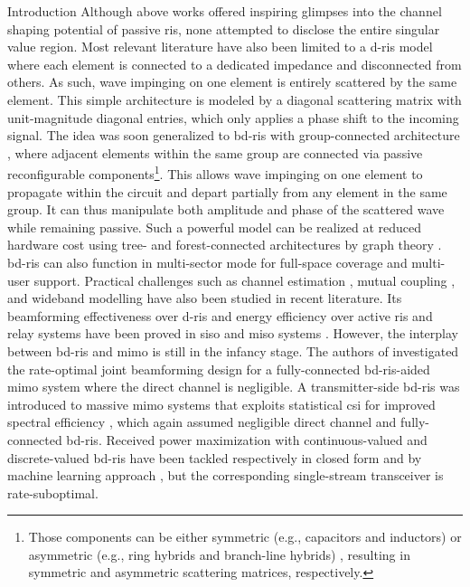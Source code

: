 \documentclass[journal]{IEEEtran}
\begin{document}
\begin{section}{Introduction}
		Although above works offered inspiring glimpses into the channel shaping potential of passive \gls{ris}, none attempted to disclose the entire singular value region.
		Most relevant literature \cite{ElMossallamy2021,Meng2023,Zheng2022,Huang2023,Bafghi2022,Zheng2023,Chae2023,Wu2019,Santamaria2023a} have also been limited to a \gls{d}-\gls{ris} model where each element is connected to a dedicated impedance and disconnected from others.
		As such, wave impinging on one element is entirely scattered by the same element.
		This simple architecture is modeled by a diagonal scattering matrix with unit-magnitude diagonal entries, which only applies a phase shift to the incoming signal.
		The idea was soon generalized to \gls{bd}-\gls{ris} with group-connected architecture \cite{Shen2020a}, where adjacent elements within the same group are connected via passive reconfigurable components\footnote{Those components can be either symmetric (e.g., capacitors and inductors) or asymmetric (e.g., ring hybrids and branch-line hybrids) \cite{Ahn2006}, resulting in symmetric and asymmetric scattering matrices, respectively.}.
		This allows wave impinging on one element to propagate within the circuit and depart partially from any element in the same group.
		It can thus manipulate both amplitude and phase of the scattered wave while remaining passive.
		Such a powerful model can be realized at reduced hardware cost using tree- and forest-connected architectures by graph theory \cite{Nerini2024}.
		\gls{bd}-\gls{ris} can also function in
		multi-sector mode \cite{Li2023c} for full-space coverage and multi-user support.
		Practical challenges such as channel estimation \cite{Li2024}, mutual coupling \cite{Li2023f}, and wideband modelling \cite{Li2024a} have also been studied in recent literature.
		Its beamforming effectiveness over \gls{d}-\gls{ris} and energy efficiency over active \gls{ris} and relay systems have been proved in \gls{siso} and \gls{miso} systems \cite{Shen2020a,Nerini2023,Nerini2024,Santamaria2023,Fang2023,Zhou2023,Li2023c,Soleymani2024}.
		However, the interplay between \gls{bd}-\gls{ris} and \gls{mimo} is still in the infancy stage.
		The authors of \cite{Bartoli2023} investigated the rate-optimal joint beamforming design for a fully-connected \gls{bd}-\gls{ris}-aided \gls{mimo} system where the direct channel is negligible.
		A transmitter-side \gls{bd}-\gls{ris} was introduced to
		massive \gls{mimo} systems that exploits statistical \gls{csi} for improved spectral efficiency \cite{Mishra2024}, which again assumed negligible direct channel and fully-connected \gls{bd}-\gls{ris}.
		Received power maximization with continuous-valued and discrete-valued \gls{bd}-\gls{ris} have been tackled respectively in closed form \cite{Nerini2023} and by machine learning approach \cite{Nerini2023b}, but the corresponding single-stream transceiver is rate-suboptimal.


\end{section}
\end{document}
